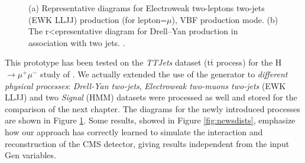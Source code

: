 \begin{figure}
    \myfloatalign
    \caption[EWK LLJJ and DY diagrams]{ (a) Representative diagrams for Electroweak two-leptons two-jets (EWK LLJJ) production (for lepton=$\mu$), VBF production mode. (b) The  r<epresentative diagram for Drell–Yan production in association with two jets. .}\label{fig:newdiag}
    
\end{figure}

This prototype has been tested on the \emph{TTJets} dataset (t$\overline{\text{t}}$ process) for the H$\rightarrow\mu^+\mu^-$ study of \cite{Sirunyan_2021}. We actually extended the use of the generator to \emph{different physical processes}: \emph{Drell-Yan two-jets}, \emph{Electroweak two-muons two-jets} (EWK LLJJ) and two \emph{Signal} (HMM) datasets were processed as well and stored for the comparison of the next chapter. The diagrams for the newly introduced processes are shown in Figure \ref{fig:newdiag}. Some results, showed in Figure \ref{fig:newsdists}, emphasize how our approach has correctly learned to simulate the interaction and reconstruction of the CMS detector, giving results independent from the input Gen variables.


